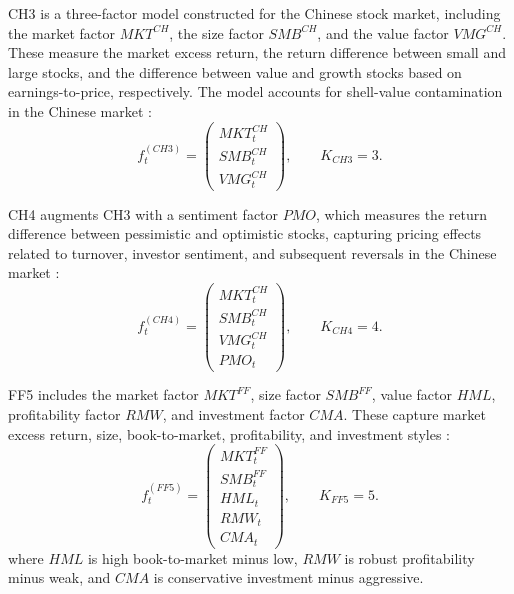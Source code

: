 \documentclass[12pt]{article}
\def\bm#1{#1}%
\def\mathrm#1{#1}%
\begin{document}
CH3 is a three-factor model constructed for the Chinese stock market, including the market factor \(\mathrm{MKT}^{CH}\), the size factor \(\mathrm{SMB}^{CH}\), and the value factor \(\mathrm{VMG}^{CH}\). These measure the market excess return, the return difference between small and large stocks, and the difference between value and growth stocks based on earnings-to-price, respectively. The model accounts for shell-value contamination in the Chinese market \cite{ref17}:
\begin{equation}
  \bm f_t^{(\mathrm{CH3})}
  =
  \begin{pmatrix}
    \mathrm{MKT}_t^{CH}\\
    \mathrm{SMB}_t^{CH}\\
    \mathrm{VMG}_t^{CH}
  \end{pmatrix},
  \qquad K_{\mathrm{CH3}}=3.
  \label{eq:ch3}
\end{equation}

CH4 augments CH3 with a sentiment factor \(\mathrm{PMO}\), which measures the return difference between pessimistic and optimistic stocks, capturing pricing effects related to turnover, investor sentiment, and subsequent reversals in the Chinese market \cite{ref17}:
\begin{equation}
  \bm f_t^{(\mathrm{CH4})}
  =
  \begin{pmatrix}
    \mathrm{MKT}_t^{CH}\\
    \mathrm{SMB}_t^{CH}\\
    \mathrm{VMG}_t^{CH}\\
    \mathrm{PMO}_t
  \end{pmatrix},
  \qquad K_{\mathrm{CH4}}=4.
  \label{eq:ch4}
\end{equation}

FF5 includes the market factor \(\mathrm{MKT}^{FF}\), size factor \(\mathrm{SMB}^{FF}\), value factor \(\mathrm{HML}\), profitability factor \(\mathrm{RMW}\), and investment factor \(\mathrm{CMA}\). These capture market excess return, size, book-to-market, profitability, and investment styles \cite{ref10}:
\begin{equation}
  \bm f_t^{(\mathrm{FF5})}
  =
  \begin{pmatrix}
    \mathrm{MKT}_t^{FF}\\
    \mathrm{SMB}_t^{FF}\\
    \mathrm{HML}_t\\
    \mathrm{RMW}_t\\
    \mathrm{CMA}_t
  \end{pmatrix},
  \qquad K_{\mathrm{FF5}}=5.
  \label{eq:ff5}
\end{equation}
where \(\mathrm{HML}\) is high book-to-market minus low, \(\mathrm{RMW}\) is robust profitability minus weak, and \(\mathrm{CMA}\) is conservative investment minus aggressive.
\end{document}
